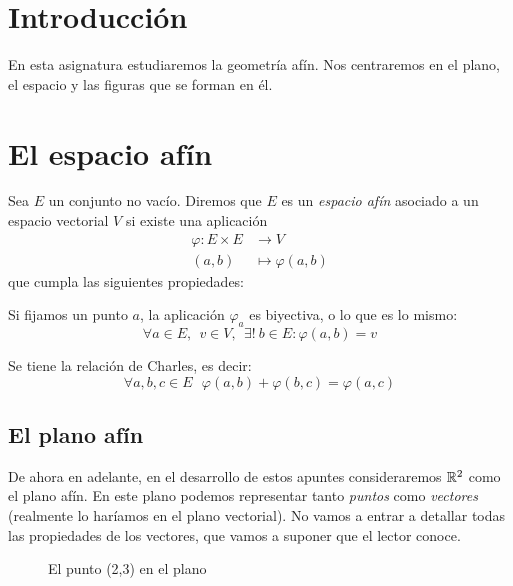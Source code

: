 
\section*{Introducción}
En esta asignatura estudiaremos la geometría afín. Nos centraremos en el plano, el espacio y las figuras que se forman en él.
\newpage

\section{El espacio afín}
\begin{ndef}
  Sea $E$ un conjunto no vacío. Diremos que $E$ es un \textit{espacio afín} asociado a un espacio vectorial $V$ si existe una aplicación
  \begin{align*}
    \varphi: E \times E & \rightarrow V \\
    (a,b) & \mapsto \varphi(a,b)
  \end{align*}
  que cumpla las siguientes propiedades:
  \begin{nlist}
  \item Si fijamos un punto $a$, la aplicación $\varphi_a$ es biyectiva, o lo que es lo mismo:
    $$\forall a \in E, \ \ v \in V, \ \ \exists! \ b \in E:\varphi(a,b)=v$$
  \item Se tiene la relación de Charles, es decir:
    $$\forall a, b, c \in E \ \ \  \varphi(a,b) + \varphi(b,c) = \varphi(a,c)$$
  \end{nlist}
\end{ndef}
\subsection{El plano afín}

De ahora en adelante, en el desarrollo de estos apuntes consideraremos $\mathbb{R}^2$ como el plano afín. En este plano podemos representar tanto \textit{puntos} como \textit{vectores} (realmente lo haríamos en el plano vectorial). No vamos a entrar a detallar todas las propiedades de los vectores, que vamos a suponer que el lector conoce. \\

\begin{figure*}[h]
	\sffamily
  \centering
  \caption{El punto (2,3) en el plano}
\end{figure*}

